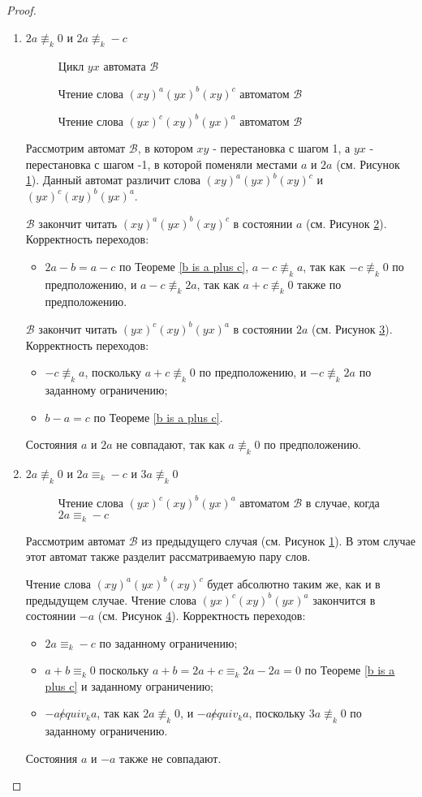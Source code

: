 \documentclass[12pt]{article}
\newcommand{\scalingimage}[3]{
	\begin{figure}
		\center{
			\texttt{[image: \#1]}
		}
		\caption{#3}
		\label{fig:#1}
	\end{figure}
}
\begin{document}
\begin{proof}
\begin{enumerate}
			\item $2a \not \equiv_k 0$ и $2a \not \equiv_k -c$
			\scalingimage{cycle_a_2a}{0.5}{Цикл $yx$ автомата $\mathscr{B}$}
			\scalingimage{process1_a_2a}{0.5}{Чтение слова $(xy)^a(yx)^b(xy)^c$ автоматом $\mathscr{B}$}
			\scalingimage{process2_a_2a}{0.5}{Чтение слова $(yx)^c(xy)^b(yx)^a$ автоматом $\mathscr{B}$}
			
			Рассмотрим автомат $\mathscr{B}$, в котором $xy$ - перестановка с шагом 1, а $yx$ - перестановка с шагом -1, в которой поменяли местами $a$ и $2a$ (см. Рисунок \ref{fig:cycle_a_2a}). Данный автомат различит слова $(xy)^a(yx)^b(xy)^c$ и $(yx)^c(xy)^b(yx)^a$.
			
			$\mathscr{B}$ закончит читать $(xy)^a(yx)^b(xy)^c$ в состоянии $a$ (см. Рисунок \ref{fig:process1_a_2a}).
			Корректность переходов:
			\begin{itemize}
				\item $2a-b = a-c$ по Теореме \ref{b is a plus c}, $a-c \not \equiv_k a$, так как $-c \not \equiv_k 0$ по предположению, и $a-c \not \equiv_k 2a$, так как $a+c \not \equiv_k 0$ также по предположению.
			\end{itemize}
		
			$\mathscr{B}$ закончит читать $(yx)^c(xy)^b(yx)^a$ в состоянии $2a$ (см. Рисунок \ref{fig:process2_a_2a}).
			Корректность переходов:
			\begin{itemize}
				\item $-c \not \equiv_k a$, поскольку $a+c \not \equiv_k 0$ по предположению, и $-c \not \equiv_k 2a$ по заданному ограничению;
				\item $b-a = c$ по Теореме \ref{b is a plus c}.
			\end{itemize}
			Состояния $a$ и $2a$ не совпадают, так как $a \not \equiv_k 0$ по предположению.
			
			\item $2a \not \equiv_k 0$ и $2a \equiv_k -c$ и $3a \not \equiv_k 0$
			\scalingimage{process2_a_2a_-c_is_2a}{0.5}{Чтение слова $(yx)^c(xy)^b(yx)^a$ автоматом $\mathscr{B}$ в случае, когда $2a \equiv_k -c$}
			
			Рассмотрим автомат $\mathscr{B}$ из предыдущего случая (см. Рисунок \ref{fig:cycle_a_2a}). В этом случае этот автомат также разделит рассматриваемую пару слов.
			
			Чтение слова $(xy)^a(yx)^b(xy)^c$ будет абсолютно таким же, как и в предыдущем случае.
			Чтение слова $(yx)^c(xy)^b(yx)^a$ закончится в состоянии $-a$ (см. Рисунок \ref{fig:process2_a_2a_-c_is_2a}).
			Корректность переходов:
			\begin{itemize}
				\item $2a \equiv_k -c$ по заданному ограничению;
				\item $a+b \equiv_k 0$ поскольку $a+b = 2a+c \equiv_k 2a - 2a = 0$ по Теореме \ref{b is a plus c} и заданному ограничению;
				\item $-a \not equiv_k a$, так как $2a \not \equiv_k 0$, и $-a \not equiv_k a$, поскольку $3a \not \equiv_k 0$ по заданному ограничению.
			\end{itemize}
			Состояния $a$ и $-a$ также не совпадают.
			

\end{enumerate}
\end{proof}
\end{document}
